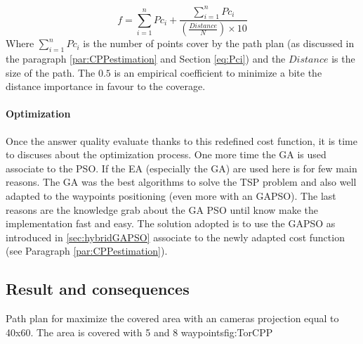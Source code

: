   \begin{equation} \label{eq:CostF2}
f=\sum_{i=1}^{n}Pc_i + \frac{\sum_{i=1}^{n}Pc_i}{(\frac{Distance}{N})\times 10}  
\end{equation}  
Where $\sum_{i=1}^{n}Pc_i$ is the number of points cover by the path plan (as discussed in the paragraph \ref{par:CPPestimation} and  Section \ref{eq:Pci}) and the $Distance$  is  the size of the path. The $0.5$ is an empirical coefficient to minimize a bite the distance importance in favour to the coverage.



\paragraph*{Optimization}
 Once the answer quality evaluate thanks to this redefined cost function, it is time to discuses about the optimization process.
One more time the GA is used associate to the PSO. If the EA (especially the GA) are used here is for few main reasons. The GA was the best algorithms to solve the TSP problem and also well adapted to the waypoints positioning (even more with an GAPSO). The last reasons are the knowledge grab about the GA PSO until know make the implementation fast and easy.
 The solution adopted is to use the GAPSO as introduced in \ref{sec:hybridGAPSO} associate to the newly adapted cost function (see Paragraph \ref{par:CPPestimation}).


		\subsection{Result  and consequences }
\begin{mfigures}[!]{Path plan for maximize the covered area with an cameras projection  equal to 40x60. The area is covered  with 5 and 8 waypoints}{fig:TorCPP} \centering
{}
\hspace{1cm}

\hspace{1cm}
\end{mfigures}
		
